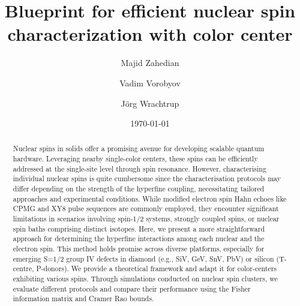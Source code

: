 \documentclass[%
 reprint,
superscriptaddress,
 amsmath,amssymb,
 aps,
]{revtex4-2}
\begin{document}

\title{Blueprint for efficient nuclear spin characterization with color center}%

\author{Majid Zahedian}


\author{Vadim Vorobyov}

 
\author{J\"org Wrachtrup}

\date{\today}%

\begin{abstract}
Nuclear spins in solids offer a promising avenue for developing scalable quantum hardware. 
Leveraging nearby single-color centers, these spins can be efficiently addressed at the single-site level through spin resonance.
However, characterising individual nuclear spins is quite cumbersome since the characterisation protocols may differ depending on the strength of the hyperfine coupling, necessitating tailored approaches and experimental conditions.
While modified electron spin Hahn echoes like CPMG and XY8 pulse sequences are commonly employed, they encounter significant limitations in scenarios involving spin-1/2 systems, strongly coupled spins, or nuclear spin baths comprising distinct isotopes.
Here, we present a more straightforward approach for determining the hyperfine interactions among each nuclear and the electron spin. 
This method holds promise across diverse platforms, especially for emerging S=1/2 group IV defects in diamond (e.g., SiV, GeV, SnV, PbV) or silicon (T-centre, P-donors). 
We provide a theoretical framework and adapt it for color-centers exhibiting various spins. Through simulations conducted on nuclear spin clusters, we evaluate different protocols and compare their performance using the Fisher information matrix and Cramer Rao bounds.
\end{abstract}
\end{document}

